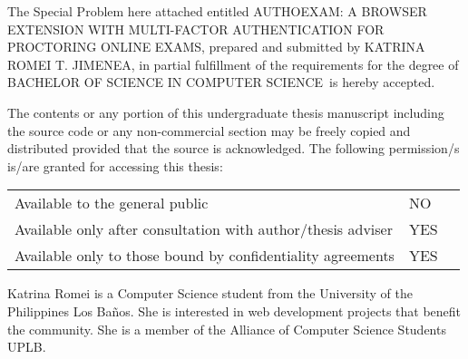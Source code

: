 \documentclass{icsthesis}
\renewcommand{\TITLE}{AUTHOEXAM: A BROWSER EXTENSION WITH MULTI-FACTOR AUTHENTICATION FOR PROCTORING ONLINE EXAMS}
\renewcommand{\AUTHOR}{KATRINA ROMEI T. JIMENEA}
\renewcommand{\DEGREE}{BACHELOR OF SCIENCE IN COMPUTER SCIENCE}
\begin{document}
\nocite{*}
\begin{frontmatter}
\maketitle
\begin{approvalpage}
			The Special Problem here attached entitled \TITLE , prepared and submitted by \AUTHOR , in partial fulfillment of the requirements for the degree of \DEGREE\ is hereby accepted.
			

            The contents or any portion of this undergraduate thesis manuscript including the source code or any non-commercial section may be freely copied and distributed provided that the source is acknowledged.
            The following permission/s is/are granted for accessing this thesis:

           \begin{table}[h]
             \centering
                \begin{tabular}{|l|l|l}
                \cline{1-2}
                Available to the general public                              & NO  &  \\ \cline{1-2}
                Available only after consultation with author/thesis adviser & YES &  \\ \cline{1-2}
                Available only to those bound by confidentiality agreements  & YES &  \\ \cline{1-2}
                \end{tabular}
            \end{table}
		\end{approvalpage}
         \begin{biosketch}
			Katrina Romei is a Computer Science student from the University of the Philippines Los Baños. She is interested in web development projects that benefit the community. She is a member of the Alliance of Computer Science Students UPLB.
		\addauthorsignaturefield
		\end{biosketch}	
	

\end{frontmatter}
\end{document}
